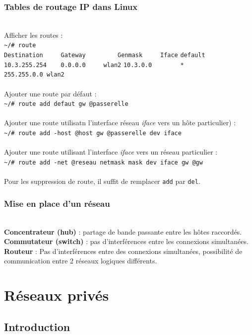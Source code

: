 \documentclass[journal, a4paper]{IEEEtran}
\begin{document}
\subsubsection{Tables de routage IP dans Linux}
~\\
Afficher les routes :\\
\lstinline$~/# route$ ~\\
\lstinline$Destination     Gateway         Genmask     Iface$
\lstinline$default         10.3.255.254    0.0.0.0     wlan2$
\lstinline$10.3.0.0        *               255.255.0.0 wlan2$
~\\
~\\
Ajouter une route par défaut :\\
\lstinline$~/# route add defaut gw @passerelle$ 
~\\
~\\
Ajouter une route utilisatn l'interface réseau \textit{iface} vers un hôte particulier) :\\
\lstinline$~/# route add -host @host gw @passerelle dev iface$
~\\
~\\
Ajouter une route utilisant l'interface \textit{iface} vers un réseau particulier :\\
\lstinline$~/# route add -net @reseau netmask mask dev iface gw @gw$
~\\
~\\
Pour les suppression de route, il suffit de remplacer \lstinline$add$ par \lstinline$del$.

\subsubsection{Mise en place d'un réseau}
~\\
\textbf{Concentrateur (hub)} : partage de bande passante entre les hôtes raccordés.
\textbf{Commutateur (switch)} : pas d'interférences entre les connexions simultanées.
\textbf{Routeur} : Pas d'interférences entre des connexions simultanées, possibilité de communication entre 2 réseaux logiques différents.

\newpage
\section{Réseaux privés}

\subsection{Introduction}
\end{document}
